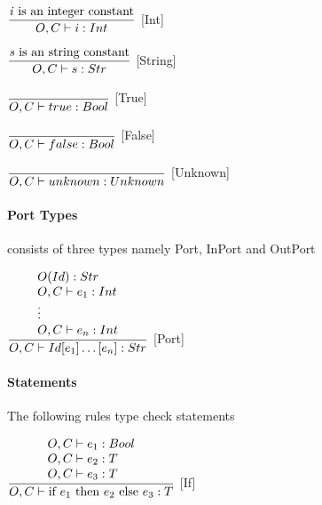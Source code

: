 \hspace*{10em} $ \dfrac{\text{\textit{i} is an integer constant}}
{O, C \vdash{} i: Int}$ [Int]\bigskip

\hspace*{10em} $ \dfrac{\text{\textit{s} is an string constant}}
{O, C \vdash{} s: Str}$ [String]\bigskip

\hspace*{10em} $ \dfrac{\phantom{}}{O, C \vdash{} true: Bool}$ [True]\bigskip

\hspace*{10em} $ \dfrac{\phantom{}}{O, C \vdash{} false: Bool}$ [False]\bigskip

\hspace*{10em} $ \dfrac{\phantom{}}{O, C \vdash{} unknown: Unknown}$ [Unknown]\bigskip

\paragraph{Port Types} consists of three types namely Port, InPort and OutPort \bigskip

\hspace*{10em} $ \dfrac{
\begin{array}{l}
	O(Id):Str \\
	O, C \vdash{} e_1 : Int \\
	\vdots \\
	O, C \vdash{} e_n : Int \\
\end{array}
}
{O, C \vdash{} Id[e_1]\ldots[e_n]:Str}$ [Port]\bigskip






\paragraph{Statements}
The following rules type check statements \bigskip

\hspace*{10em} $ \dfrac{\begin{array}{l}
	{O, C \vdash {} e_1: Bool} \\
	{O, C \vdash{} e_2: T} \\
	{O, C \vdash{} e_3: T} \\
\end{array}}
{O, C \vdash{} \text{if } e_1 \text{ then } e_2 \text{ else } e_3: T}$
[If]\bigskip


